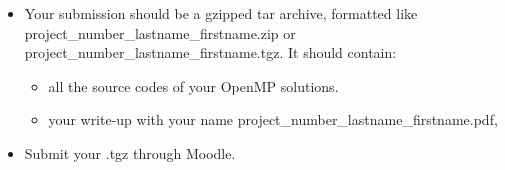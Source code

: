\documentclass[unicode,11pt,a4paper,oneside,numbers=endperiod,openany]{scrartcl}
\begin{document}
\begin{itemize}
\item Your submission should be a gzipped tar archive, formatted like project\_number\_lastname\_firstname.zip or project\_number\_lastname\_firstname.tgz. 
      It should contain:
  \begin{itemize}
    \item all the source codes of your OpenMP solutions.
    \item your write-up with your name  project\_number\_lastname\_firstname.pdf, 
  \end{itemize}
   \item Submit your .tgz through Moodle.
  \end{itemize}
\end{document}
